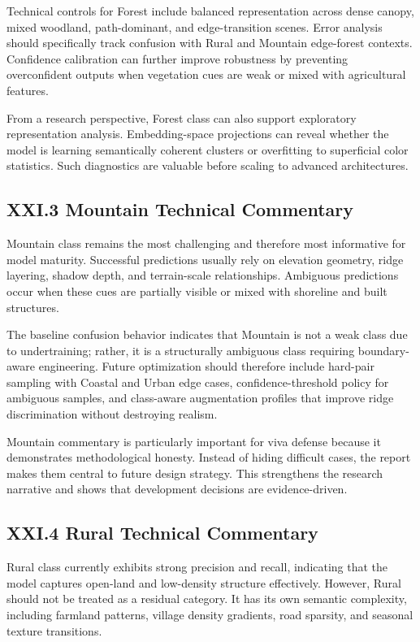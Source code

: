 Technical controls for Forest include balanced representation across dense canopy, mixed woodland, path-dominant, and edge-transition scenes. Error analysis should specifically track confusion with Rural and Mountain edge-forest contexts. Confidence calibration can further improve robustness by preventing overconfident outputs when vegetation cues are weak or mixed with agricultural features.

From a research perspective, Forest class can also support exploratory representation analysis. Embedding-space projections can reveal whether the model is learning semantically coherent clusters or overfitting to superficial color statistics. Such diagnostics are valuable before scaling to advanced architectures.

\subsection*{XXI.3 Mountain Technical Commentary}
Mountain class remains the most challenging and therefore most informative for model maturity. Successful predictions usually rely on elevation geometry, ridge layering, shadow depth, and terrain-scale relationships. Ambiguous predictions occur when these cues are partially visible or mixed with shoreline and built structures.

The baseline confusion behavior indicates that Mountain is not a weak class due to undertraining; rather, it is a structurally ambiguous class requiring boundary-aware engineering. Future optimization should therefore include hard-pair sampling with Coastal and Urban edge cases, confidence-threshold policy for ambiguous samples, and class-aware augmentation profiles that improve ridge discrimination without destroying realism.

Mountain commentary is particularly important for viva defense because it demonstrates methodological honesty. Instead of hiding difficult cases, the report makes them central to future design strategy. This strengthens the research narrative and shows that development decisions are evidence-driven.

\subsection*{XXI.4 Rural Technical Commentary}
Rural class currently exhibits strong precision and recall, indicating that the model captures open-land and low-density structure effectively. However, Rural should not be treated as a residual category. It has its own semantic complexity, including farmland patterns, village density gradients, road sparsity, and seasonal texture transitions.

